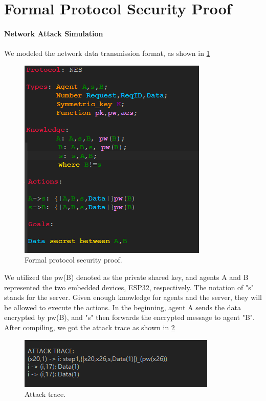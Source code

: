 \documentclass[conference]{IEEEtran}
\begin{document}
\section{Formal Protocol Security Proof}
\label{appendix:formal_protocol_security_proof}


\paragraph{Network Attack Simulation}
We modeled the network data transmission format, as shown in \cref{fig:ofmc_protocol}
\begin{figure}[h]
	\hspace*{0.4cm}
	\includegraphics[width=0.8\linewidth]{assets/ofmc_protocol.png}
	\vspace{-0.2cm}
	\caption{Formal protocol security proof.}
	\label{fig:ofmc_protocol}
\end{figure}  

We utilized the pw(B) denoted as the private shared key, and agents A and B represented the two embedded devices, ESP32, respectively.
The notation of "s" stands for the server.
Given enough knowledge for agents and the server, they will be allowed to execute the actions.
In the beginning, agent A sends the data encrypted by pw(B), and "s" then forwards the encrypted message to agent "B".
After compiling, we got the attack trace as shown in \cref{fig:attack_trace}

\begin{figure}[h]
	\hspace*{0.4cm}
	\includegraphics[width=0.8\linewidth]{assets/attack trace.png}
	\vspace{-0.2cm}
	\caption{Attack trace.}
	\label{fig:attack_trace}
\end{figure}
\end{document}
